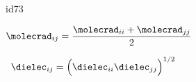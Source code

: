 \begin{mitframe}{id73}

    
\begin{listone}
    
    \item $\molecrad_{ij} = \dfrac{\molecrad_{ii}+\molecrad_{jj}}{2}$
        
    \item ~$\dielec_{ij} = \Big(\dielec_{ii}\dielec_{jj}\Big)^{1/2} $
    
\end{listone}
 
\end{mitframe}